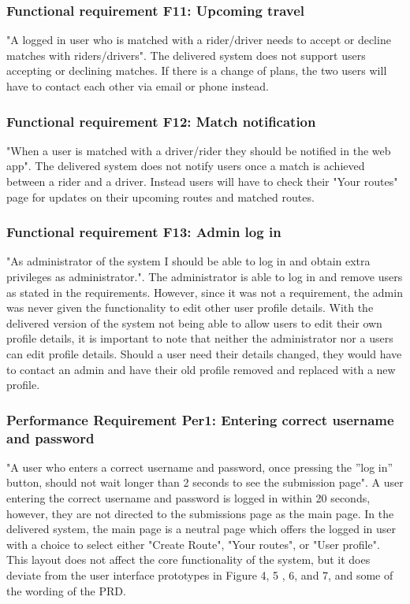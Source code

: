\documentclass{article}
\begin{document}
\subsubsection{Functional requirement F11: Upcoming travel}
"A logged in user who is matched with a rider/driver needs to accept or decline matches with riders/drivers"\cite{PRD}. The delivered system does not support users accepting or declining matches. If there is a change of plans, the two users will have to contact each other via email or phone instead.

\subsubsection{Functional requirement F12: Match notification}
"When a user is matched with a driver/rider they should be notified in the web app"\cite{PRD}. The delivered system does not notify users once a match is achieved between a rider and a driver. Instead users will have to check their "Your routes" page for updates on their upcoming routes and matched routes.

\subsubsection{Functional requirement F13: Admin log in}
"As administrator of the system I should be able to log in and obtain extra privileges as administrator."\cite{PRD}. The administrator is able to log in and remove users as stated in the requirements. However, since it was not a requirement, the admin was never given the functionality to edit other user profile details. With the delivered version of the system not being able to allow users to edit their own profile details, it is important to note that neither the administrator nor a users can edit profile details. Should a user need their details changed, they would have to contact an admin and have their old profile removed and replaced with a new profile.

\subsubsection{Performance Requirement Per1: Entering correct username and password}
"A user who enters a correct username and password, once pressing the ”log in” button, should not wait longer than 2 seconds to see the submission page"\cite{PRD}. A user entering the correct username and password is logged in within 20 seconds, however, they are not directed to the submissions page as the main page. In the delivered system, the main page is a neutral page which offers the logged in user with a choice to select either "Create Route", "Your routes", or "User profile". This layout does not affect the core functionality of the system, but it does deviate from the user interface prototypes in Figure 4, 5 , 6, and 7, and some of the wording of the PRD\cite{PRD}.
\end{document}

